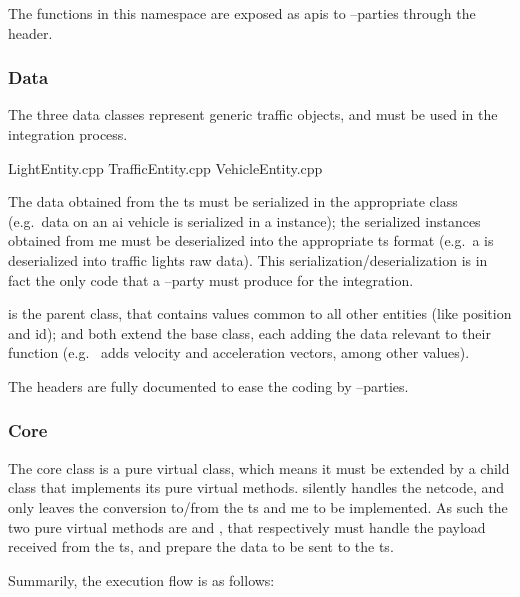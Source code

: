 The functions in this namespace are exposed as \glspl{api} to --parties through the  header.

\subsubsection{Data}

The three data classes represent generic traffic objects, and must be used in the integration process.

\begin{filelist}
	LightEntity.cpp
	TrafficEntity.cpp
	VehicleEntity.cpp
\end{filelist}

The data obtained from the \gls{ts} must be serialized in the appropriate class (e.g.\ data on an \gls{ai} vehicle is serialized in a  instance); the serialized instances obtained from \gls{me} must be deserialized into the appropriate \gls{ts} format (e.g.\ a  is deserialized into traffic lights raw data). This serialization/deserialization is in fact the only code that a --party must produce for the integration.

 is the parent class, that contains values common to all other entities (like position and id);  and  both extend the base class, each adding the data relevant to their function (e.g.\  adds velocity and acceleration vectors, among other values).

The headers are fully documented to ease the coding by --parties.

\subsubsection{Core}

The core class is a pure virtual class, which means it must be extended by a child class that implements its pure virtual methods.  silently handles the netcode, and only leaves the conversion to/from the \gls{ts} and \gls{me} to be implemented. As such the two pure virtual methods are  and , that respectively must handle the \gls{payload} received from the \gls{ts}, and prepare the data to be sent to the \gls{ts}.

Summarily, the execution flow is as follows:

